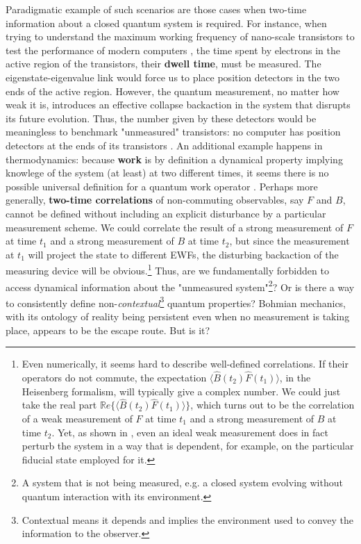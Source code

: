 \documentclass[11pt, a4paper]{article} %
\begin{document}
Paradigmatic example of such scenarios are those cases when two-time information about a closed quantum system is required. For instance, when trying to understand the maximum working frequency of nano-scale transistors to test the performance of modern computers \cite{modern}, the time spent by electrons in the active region of the transistors, their {\bf dwell time}, must be measured. The eigenstate-eigenvalue link would force us to place position detectors in the two ends of the active region. However, the quantum measurement, no matter how weak it is, introduces an effective collapse backaction in the system that disrupts its future evolution. Thus, the number given by these detectors would be meaningless to benchmark "unmeasured" transistors: no computer has position detectors at the ends of its transistors \cite{tunnel1, tunnel2}. An additional example happens in thermodynamics: because {\bf work} is by definition a dynamical property implying knowlege of the system (at least) at two different times, it seems there is no possible universal definition for a quantum work operator \cite{nogo, workPb1, workPb2}. Perhaps more generally, {\bf two-time correlations} of non-commuting observables, say $F$ and $B$, cannot be defined without including an explicit disturbance by a particular measurement scheme. We could correlate the result of a strong measurement of $F$ at time $t_1$ and a strong measurement of $B$ at time $t_2$, but since the measurement at $t_1$ will project the state to different EWFs, the disturbing backaction of the measuring device will be obvious.\footnote{ Even numerically, it seems hard to describe well-defined correlations. If their operators do not commute, the expectation $\langle \hat{B}(t_2)\hat{F}(t_1)\rangle$, in the Heisenberg formalism, will typically give a complex number. We could just take the real part $\mathbb{R}e \big\{\langle \hat{B}(t_2)\hat{F}(t_1)\rangle\big\}$, which turns out to be the correlation of a weak measurement \cite{Weak} of $F$ at time $t_1$ and a strong measurement of $B$ at time $t_2$. Yet, as shown in \cite{DevInPosition2}, even an ideal weak measurement does in fact perturb the system in a way that is dependent, for example, on the particular fiducial state employed for it.} Thus, are we fundamentally forbidden to access dynamical information about the "unmeasured system"\footnote{A system that is not being measured, e.g. a closed system evolving without quantum interaction with its environment.}? Or is there a way to consistently define non-{\em contextual}\footnote{Contextual means it depends and implies the environment used to convey the information to the observer.} quantum properties? Bohmian mechanics, with its ontology of reality being persistent even when no measurement is taking place, appears to be the escape route. But is it?  \vspace{-0.15cm}
\end{document}
